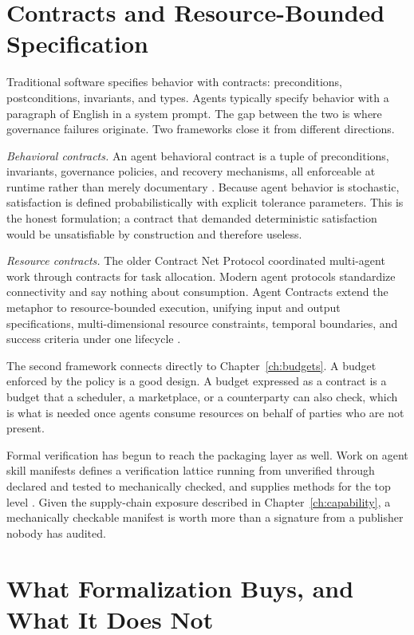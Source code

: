 \documentclass[11pt]{book}
\begin{document}
\section{Contracts and Resource-Bounded Specification}

Traditional software specifies behavior with contracts: preconditions, postconditions, invariants, and types. Agents typically specify behavior with a paragraph of English in a system prompt. The gap between the two is where governance failures originate. Two frameworks close it from different directions.

\textit{Behavioral contracts.} An agent behavioral contract is a tuple of preconditions, invariants, governance policies, and recovery mechanisms, all enforceable at runtime rather than merely documentary \cite{agentcontracts2026}. Because agent behavior is stochastic, satisfaction is defined probabilistically with explicit tolerance parameters. This is the honest formulation; a contract that demanded deterministic satisfaction would be unsatisfiable by construction and therefore useless.

\textit{Resource contracts.} The older Contract Net Protocol coordinated multi-agent work through contracts for task allocation. Modern agent protocols standardize connectivity and say nothing about consumption. Agent Contracts extend the metaphor to resource-bounded execution, unifying input and output specifications, multi-dimensional resource constraints, temporal boundaries, and success criteria under one lifecycle \cite{resourcecontracts2026}.

The second framework connects directly to Chapter~\ref{ch:budgets}. A budget enforced by the policy is a good design. A budget expressed as a contract is a budget that a scheduler, a marketplace, or a counterparty can also check, which is what is needed once agents consume resources on behalf of parties who are not present.

Formal verification has begun to reach the packaging layer as well. Work on agent skill manifests defines a verification lattice running from unverified through declared and tested to mechanically checked, and supplies methods for the top level \cite{skillverify2026}. Given the supply-chain exposure described in Chapter~\ref{ch:capability}, a mechanically checkable manifest is worth more than a signature from a publisher nobody has audited.

\section{What Formalization Buys, and What It Does Not}
\end{document}
